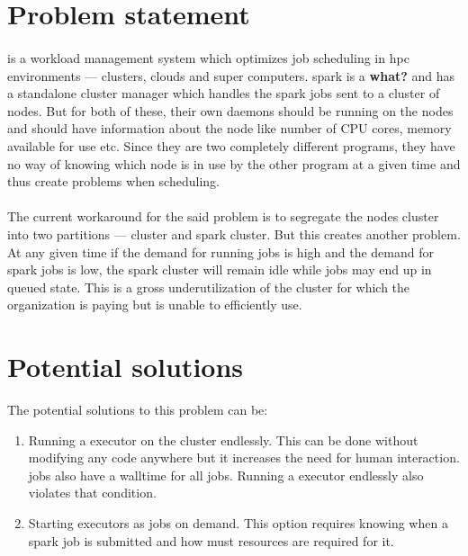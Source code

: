 
\section{Problem statement}

\paragraph{}
 is a workload management system which optimizes \gls{job}
scheduling in \gls{hpc} environments --- clusters, clouds and super computers.
\gls{spark} is a {\bf what?} and has a standalone cluster manager which handles
the spark jobs sent to a cluster of nodes. But for both of these, their own
daemons
should be running on the nodes and should have information about the node like
number of CPU cores, memory available for use etc. Since they are two completely
different programs, they have no way of knowing which node is in use by the
other program at a given time and thus create problems when scheduling.

\paragraph{}
The current workaround for the said problem is to segregate the nodes cluster
into two partitions ---  cluster and \gls{spark} cluster. But
this creates another problem. At any given time if the demand for running
 jobs is high and the demand for \gls{spark} jobs is low, the
\gls{spark} cluster will remain idle while  jobs may end up in
queued state. This is a gross underutilization of the cluster for which the
organization is paying but is unable to efficiently use.


\section{Potential solutions}

The potential solutions to this problem can be:
\begin{enumerate}
    \item Running a \gls{executor} on the  cluster
        endlessly. This can be done without modifying any code anywhere but it
        increases the need for human interaction.  jobs also
        have a \gls{walltime} for all jobs. Running a \gls{executor}
        endlessly also violates that condition.
    \item Starting \glspl{executor} as  jobs on demand.
        This option requires knowing when a \gls{spark} job is submitted and how
        must resources are required for it.
\end{enumerate}


